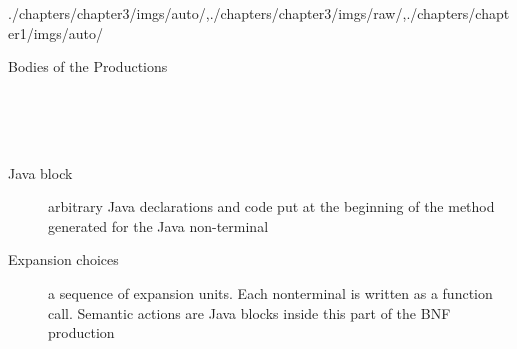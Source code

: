 \begin{graphicspathcontext}{{./chapters/chapter3/imgs/auto/},{./chapters/chapter3/imgs/raw/},{./chapters/chapter1/imgs/auto/}}
\begin{bibunit}[apalike]

\begin{frame}[t]{Bodies of the Productions}
	\begin{definition}\small
		 \\
		 \\
		 \\
	\end{definition}
	\begin{description}
	\item[Java block] arbitrary Java declarations and code put at the beginning of the method generated for the Java non-terminal
	\item[Expansion choices] a sequence of expansion units. Each nonterminal is written as a function call. Semantic actions are Java blocks inside this part of the BNF production
	\end{description}
\end{frame}


\end{bibunit}
\end{graphicspathcontext}
